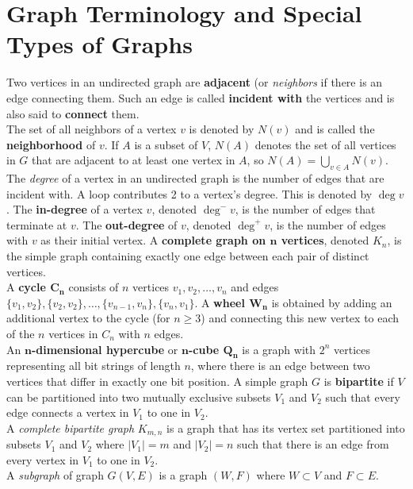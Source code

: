 \documentclass[./Discrete Math.tex]{subfiles}
\begin{document}
	\section{Graph Terminology and Special Types of Graphs}
		Two vertices in an undirected graph are \textbf{adjacent} (or \textit{neighbors} if there is an edge connecting them. Such an edge is called \textbf{incident with} the vertices and is also said to \textbf{connect} them. \\
		The set of all neighbors of a vertex \(v\) is denoted by \(N(v)\) and is called the \textbf{neighborhood} of \(v\). If \(A\) is a subset of \(V\), \(N(A)\) denotes the set of all vertices in \(G\) that are adjacent to at least one vertex in \(A\), so \(N(A) = \bigcup\limits_{v \in A} N(v)\). 
		The \textit{degree} of a vertex in an undirected graph is the number of edges that are incident with. A loop contributes 2 to a vertex's degree. This is denoted by \(\deg v\).
		The \textbf{in-degree} of a vertex \(v\), denoted \(\deg^-v\), is the number of edges that terminate at \(v\). The \textbf{out-degree} of \(v\), denoted \(\deg^+v\), is the number of edges with \(v\) as their initial vertex.
		A \textbf{complete graph on \(\bm{n}\) vertices}, denoted \(K_n\), is the simple graph containing exactly one edge between each pair of distinct vertices. \\
		A \textbf{cycle \(\bm{C_n}\)} consists of \(n\) vertices \(v_1, v_2, \ldots, v_n\) and edges \(\{v_1, v_2\}, \{v_2, v_2\}, \ldots, \{v_{n - 1}, v_n\}, \{v_n, v_1\}\). A \textbf{wheel \(\bm{W_n}\)} is obtained by adding an additional vertex to the cycle (for \(n \ge 3\)) and connecting this new vertex to each of the \(n\) vertices in \(C_n\) with \(n\) edges. \\
		An \textbf{\(\bm{n}\)-dimensional hypercube} or \textbf{\(\bm{n}\)-cube \(\bm{Q_n}\)}  is a graph with \(2^n\) vertices representing all bit strings of length \(n\), where there is an edge between two vertices that differ in exactly one bit position.
		A simple graph \(G\) is \textbf{bipartite} if \(V\) can be partitioned into two mutually exclusive subsets \(V_1\) and \(V_2\) such that every edge connects a vertex in \(V_1\) to one in \(V_2\). \\
		A \textit{complete bipartite graph} \(K_{m, n}\) is a graph that has its vertex set partitioned into subsets \(V_1\) and \(V_2\) where \(|V_1| = m\) and \(|V_2| = n\) such that there is an edge from every vertex in \(V_1\) to one in \(V_2\). \\
		A \textit{subgraph} of graph \(G(V, E)\) is a graph \((W, F)\) where \(W \subset V\) and \(F \subset E\).
\end{document}
